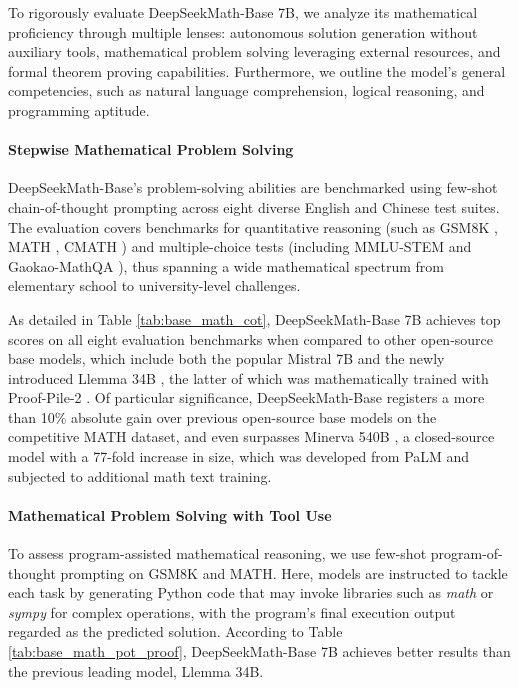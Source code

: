 To rigorously evaluate DeepSeekMath-Base 7B, we analyze its mathematical proficiency through multiple lenses: autonomous solution generation without auxiliary tools, mathematical problem solving leveraging external resources, and formal theorem proving capabilities. Furthermore, we outline the model’s general competencies, such as natural language comprehension, logical reasoning, and programming aptitude.

\paragraph{Stepwise Mathematical Problem Solving}

DeepSeekMath-Base’s problem-solving abilities are benchmarked using few-shot chain-of-thought prompting \citep{cot} across eight diverse English and Chinese test suites. The evaluation covers benchmarks for quantitative reasoning (such as GSM8K \citep{gsm8k}, MATH \citep{MATH}, CMATH \citep{wei2023cmath}) and multiple-choice tests (including MMLU-STEM \citep{mmlu} and Gaokao-MathQA \citep{agieval}), thus spanning a wide mathematical spectrum from elementary school to university-level challenges.

As detailed in Table \ref{tab:base_math_cot}, DeepSeekMath-Base 7B achieves top scores on all eight evaluation benchmarks when compared to other open-source base models, which include both the popular Mistral 7B \citep{mistral} and the newly introduced Llemma 34B \citep{llemma}, the latter of which was mathematically trained with Proof-Pile-2 \citep{llemma}. Of particular significance, DeepSeekMath-Base registers a more than 10\% absolute gain over previous open-source base models on the competitive MATH dataset, and even surpasses Minerva 540B \citep{minerva}, a closed-source model with a 77-fold increase in size, which was developed from PaLM \citep{palm} and subjected to additional math text training.

\paragraph{Mathematical Problem Solving with Tool Use} To assess program-assisted mathematical reasoning, we use few-shot program-of-thought prompting \citep{pot,pal} on GSM8K and MATH. Here, models are instructed to tackle each task by generating Python code that may invoke libraries such as \textit{math} or \textit{sympy} for complex operations, with the program's final execution output regarded as the predicted solution. According to Table \ref{tab:base_math_pot_proof}, DeepSeekMath-Base 7B achieves better results than the previous leading model, Llemma 34B.

